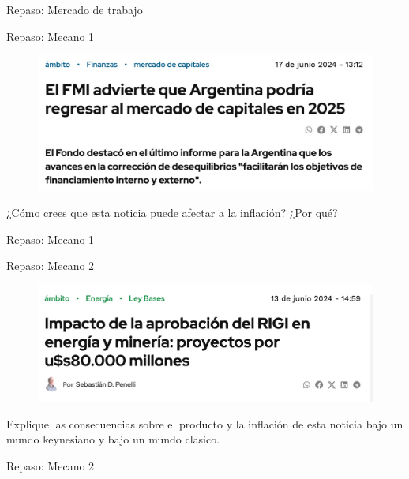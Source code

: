 \documentclass{beamer}
\begin{document}
\begin{frame}{Repaso: Mercado de trabajo}
    
\end{frame}

\begin{frame}{Repaso: Mecano 1}

    \begin{figure}[h!]
        \centering
        \includegraphics[width=1\textwidth]{../Figures/ejercicio_noticia1.jpg}
    \end{figure}
    ¿Cómo crees que esta noticia puede afectar a la inflación? ¿Por qué?
\end{frame}

\begin{frame}{Repaso: Mecano 1}
    
\end{frame}

\begin{frame}{Repaso: Mecano 2}

    \begin{figure}[h!]
        \centering
        \includegraphics[width=1\textwidth]{../Figures/ejercicio_noticia2.jpg}
    \end{figure}
    Explique las consecuencias sobre el producto y la inflación de esta noticia bajo un mundo keynesiano y bajo un mundo clasico.
\end{frame}

\begin{frame}{Repaso: Mecano 2}
    
\end{frame}
\end{document}
